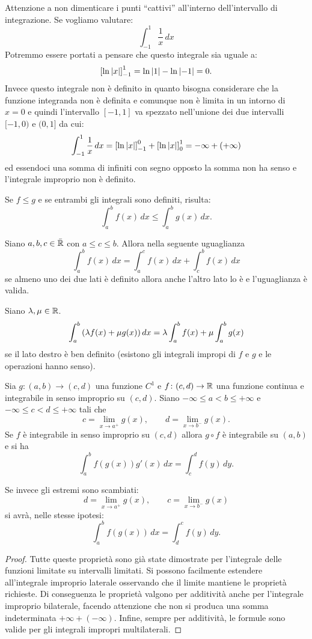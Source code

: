 \begin{remark}
Attenzione a non dimenticare i punti ``cattivi'' all'interno dell'intervallo
di integrazione. Se vogliamo valutare:
\[
  \int_{-1}^1 \frac{1}{x}\, dx
\]
Potremmo essere portati a pensare che questo integrale sia uguale a:
\[
 {\left[ \ln {\left|x\right|} \right]}_{-1}^1 = \ln {\left|1\right|} - \ln {\left|-1\right|} = 0.
\]
Invece questo integrale non è definito in quanto bisogna considerare
che la funzione integranda non è definita e comunque non è limita in un
intorno di $x=0$ e quindi l'intervallo $[-1,1]$ va spezzato nell'unione
dei due intervalli $[-1,0)$ e $(0,1]$ da cui:
\[
  \int_{-1}^1 \frac{1}{x}\, dx = {\left[ \ln {\left|x\right|} \right]}_{-1}^0 + {\left[ \ln{\left|x\right|} \right]}_0^{1}
   = -\infty + (+\infty)
\]
ed essendoci una somma di infiniti con segno opposto la somma non ha senso
e l'integrale improprio non è definito.
\end{remark}

\begin{theorem}
\label{th:proprieta_integrale_improprio}
Se $f\le g$ e se entrambi gli integrali sono definiti, risulta:
\[
  \int_a^b f(x)\, dx \le \int_a^b g(x)\, dx.
\]

Siano $a,b,c \in \bar {\mathbb R}$ con $a\le c \le b$.
Allora nella seguente uguaglianza
\[
  \int_a^b f(x)\, dx = \int_a^c f(x)\, dx + \int_c^b f(x)\, dx
\]
se almeno uno dei due lati è definito allora anche l'altro lato lo è e
l'uguaglianza è valida.

Siano $\lambda, \mu \in \mathbb R$.
\[
  \int_a^b {\left( \lambda f(x) + \mu g(x) \right)}\, dx
  = \lambda \int_a^b f(x) + \mu \int_a^b g(x)
\]
se il lato destro è ben definito (esistono gli integrali impropi di $f$ e $g$
e le operazioni hanno senso).

Sia $g\colon (a,b)\to (c,d)$ una funzione $C^1$
e $f\colon (c,d) \to \mathbb R$ una funzione continua
e integrabile in senso improprio su $(c,d)$.
Siano $-\infty \le a < b \le +\infty$ e
$-\infty \le c < d \le +\infty$ tali che
\[
c = \lim_{x\to a^+} g(x),
\qquad
d = \lim_{x\to b^-} g(x).
\]
Se $f$ è integrabile in senso improprio su $(c,d)$
allora $g \circ f$ è integrabile su $(a,b)$ e
si ha
\[
\int_a^b f(g(x)) g'(x)\, dx = \int_c^d f(y)\, dy.
\]

Se invece gli estremi sono scambiati:
\[
d = \lim_{x\to a^+} g(x),
\qquad
c = \lim_{x\to b^-} g(x)
\]
si avrà, nelle stesse ipotesi:
\[
  \int_a^b f(g(x))\, dx = \int_d^c f(y)\, dy.
\]
\end{theorem}
%
\begin{proof}
Tutte queste proprietà sono già state dimostrate per l'integrale delle funzioni
limitate su intervalli limitati. Si possono facilmente estendere all'integrale
improprio laterale osservando che il limite mantiene le proprietà richieste.
Di conseguenza le proprietà valgono per additività anche per l'integrale
improprio bilaterale, facendo attenzione che non si produca una somma
indeterminata $+\infty + (-\infty)$.
Infine, sempre per additività, le formule sono valide per gli integrali
impropri multilaterali.
\end{proof}

